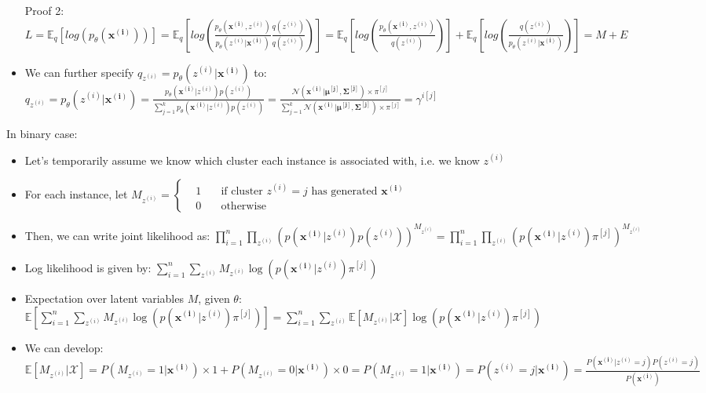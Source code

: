\begin{itemize}
    Proof 2:\\
    $L = \mathbb{E}_q[log(p_{\theta}(\boldsymbol{x^{(i)}}))] = \mathbb{E}_q[log(\frac{ p_{\theta}(\boldsymbol{x^{(i)}}, z^{(i)}) }{ p_{\theta}(z^{(i)} | \boldsymbol{x^{(i)}}) } \frac{ q(z^{(i)}) }{ q(z^{(i)}) } )] = \mathbb{E}_q[ log( \frac{ p_{\theta}(\boldsymbol{x^{(i)}}, z^{(i)}) } { q(z^{(i)}) } ) ] + \mathbb{E}_q[ log(\frac{ q(z^{(i)}) }{ p_{\theta}(z^{(i)} | \boldsymbol{x^{(i)}}) }) ] = M + E$
    \item We can further specify $q_{z^{(i)}} = p_\theta( z^{(i)} |\boldsymbol{x^{(i)}})$ to: $q_{z^{(i)}} = p_\theta( z^{(i)} |\boldsymbol{x^{(i)}}) = \frac{ p_\theta( \boldsymbol{x^{(i)}} | z^{(i)}) p( z^{(i)}) }{ \sum_{j=1}^k p_\theta( \boldsymbol{x^{(i)}} | z^{(i)}) p( z^{(i)}) } = \frac{ \mathcal{N}(\boldsymbol{x^{(i)}} | \boldsymbol{\mu^{[j]}}, \boldsymbol{\Sigma^{[j]}}) \times \pi^{[j]} } { \sum_{j=1}^k \mathcal{N}(\boldsymbol{x^{(i)}} | \boldsymbol{\mu^{[j]}}, \boldsymbol{\Sigma^{[j]}}) \times \pi^{[j]} } = \gamma^{i[j]}$
\end{itemize}
In binary case:
\begin{itemize}
    \item Let's temporarily assume we know which cluster each instance is associated with, i.e. we know $z^{(i)}$
    \item For each instance, let 
    $M_{z^{(i)}} = 
    \left\{
        \begin{aligned}
             & 1 \quad & \text{if cluster } z^{(i)} = j \text{ has generated } \boldsymbol{x^{(i)}}\\
             & 0 \quad & \text{otherwise}   
        \end{aligned}
    \right.$
    \item Then, we can write joint likelihood as: $\prod_{i=1}^n \prod_{z^{(i)}} (p(\boldsymbol{x^{(i)}} | z^{(i)}) p(z^{(i)}))^{M_{z^{(i)}}} = \prod_{i=1}^n \prod_{z^{(i)}} (p(\boldsymbol{x^{(i)}} | z^{(i)}) \pi^{[j]})^{M_{z^{(i)}}}$
    \item Log likelihood is given by: $\sum_{i=1}^n \sum_{z^{(i)}} M_{z^{(i)}}\log(p(\boldsymbol{x^{(i)}} | z^{(i)}) \pi^{[j]})$
    \item Expectation over latent variables $M$, given $\theta$: $\mathbb{E} [ \sum_{i=1}^n \sum_{z^{(i)}} M_{z^{(i)}}\log(p(\boldsymbol{x^{(i)}} | z^{(i)}) \pi^{[j]}) ] = \sum_{i=1}^n \sum_{z^{(i)}} \mathbb{E} [ M_{z^{(i)}} | \mathcal{X}] \log(p(\boldsymbol{x^{(i)}} | z^{(i)}) \pi^{[j]})$
    \item We can develop: $\mathbb{E} [ M_{z^{(i)}} | \mathcal{X}] = P(M_{z^{(i)}} = 1 | \boldsymbol{x^{(i)}}) \times 1 + P(M_{z^{(i)}} = 0 | \boldsymbol{x^{(i)}}) \times 0 = P(M_{z^{(i)}} = 1 | \boldsymbol{x^{(i)}}) = P(z^{(i)} = j | \boldsymbol{x^{(i)}}) = \frac{P(\boldsymbol{x^{(i)}} | z^{(i)} = j)P(z^{(i)} = j)}{P(\boldsymbol{x^{(i)}})}$
\end{itemize}

